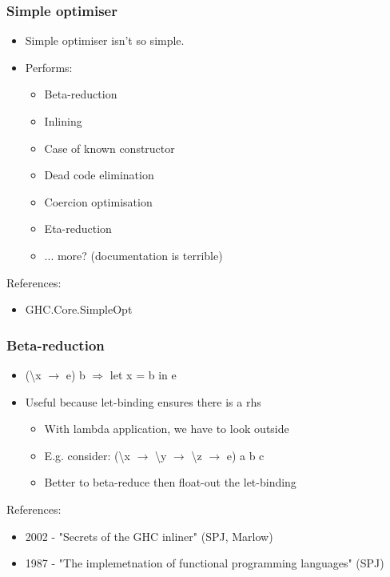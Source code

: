 \documentclass[aspectratio=169]{beamer}
\begin{document}
\begin{frame}
  \frametitle{Simple optimiser}

  \begin{itemize}
    \item Simple optimiser isn't so simple.
    \item Performs:
      \begin{itemize}
        \item Beta-reduction
        \item Inlining
        \item Case of known constructor
        \item Dead code elimination
        \item Coercion optimisation
        \item Eta-reduction
        \item ... more? (documentation is terrible)
      \end{itemize}
  \end{itemize}

  References:
  \begin{itemize}
    \item GHC.Core.SimpleOpt
  \end{itemize}
\end{frame}

\begin{frame}
  \frametitle{Beta-reduction}

  \begin{itemize}
    \item (\textbackslash{}x $\rightarrow$ e) b $\Longrightarrow$ let x = b in e
    \item Useful because let-binding ensures there is a rhs
    \begin{itemize}
      \item With lambda application, we have to look outside
      \item E.g. consider: (\textbackslash{}x $\rightarrow$ \textbackslash{}y
        $\rightarrow$ \textbackslash{}z $\rightarrow$ e) a b c
      \item Better to beta-reduce then float-out the let-binding
    \end{itemize}
  \end{itemize}

  References:

  \begin{itemize}
    \item 2002 - "Secrets of the GHC inliner" (SPJ, Marlow)
    \item 1987 - "The implemetnation of functional programming languages" (SPJ)
  \end{itemize}
\end{frame}
\end{document}
